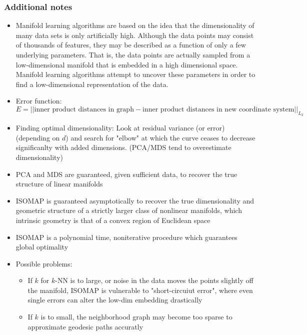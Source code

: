 \subsubsection*{Additional notes}
\begin{itemize}
    \item Manifold learning algorithms are based on the idea that the dimensionality of many data sets is only artificially high. Although the data points may consist of thousands of features, they may be described as a function of only a few underlying parameters. That is, the data points are actually sampled from a low-dimensional manifold that is embedded in a high dimensional space. Manifold learning algorithms attempt to uncover these parameters in order to find a low-dimensional representation of the data.
    \item Error function: \[E = ||\text{inner product distances in graph} - \text{inner product distances in new coordinate system}||_{L_2}\]
    \item Finding optimal dimensionality: Look at residual variance (or error) (depending on \(d\)) and search for "elbow" at which the curve ceases to decrease significanlty with added dimensions. (PCA/MDS tend to overestimate dimensionality)
    \item PCA and MDS are guaranteed, given sufficient data, to recover the true structure of linear manifolds
    \item ISOMAP is guaranteed asymptotically to recover the true dimensionality and geometric structure of a strictly larger class of nonlinear manifolds, which intrinsic geometry is that of a convex region of Euclidean space
    \item ISOMAP is a polynomial time, noniterative procedure which guarantees global optimality
    \item Possible problems:

        \begin{itemize}
            \item If \(k\) for \(k\)-NN is to large, or noise in the data moves the points slightly off the manifold, ISOMAP is vulnerable to "short-circuiut error", where even single errors can alter the low-dim embedding drastically
            \item If \(k\) is to small, the neighborhood graph may become too sparse to approximate geodesic paths accuratly
        \end{itemize}

\end{itemize}
